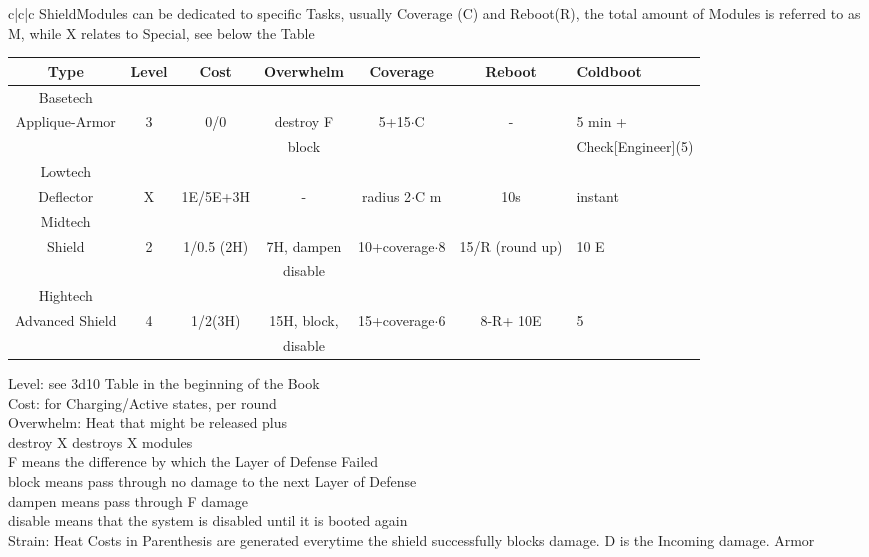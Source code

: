 \documentclass{article}
\newcommand\tab[1][1cm]{\hspace*{#1}}
\begin{document}
\begin{tabular}{c|c|c}
    ShieldModules can be dedicated to specific Tasks, usually
    Coverage (C) and Reboot(R), the total amount of Modules is referred to as M, while
    X relates to Special, see below the Table\newline
    \begin{tabular}{c|cccccl}
        Type & Level & Cost & Overwhelm & Coverage & Reboot & Coldboot \\
        \hline Basetech\\
        Applique-Armor & 3 & 0/0 & destroy F& 5+15\(\cdot\)C & -  & 5 min + \\
        &&&block&&& Check[Engineer](5) \\
        \hline Lowtech\\
        Deflector & X & 1E/5E+3H & - & radius 2\(\cdot\)C m & 10s & instant \\
        \hline Midtech\\
        Shield & 2 & 1/0.5 (2H) & 7H, dampen & 10+coverage\(\cdot\)8 & 15/R (round up) & 10 E \\
        & & & disable\\
        \hline Hightech\\
        Advanced Shield & 4 & 1/2(3H) & 15H, block,& 15+coverage\(\cdot\)6 & 8-R+ 10E & 5 \\
        &&& disable\\
    \end{tabular}\newline\newline\newline
    Level: see 3d10 Table in the beginning of the Book\\
    Cost: for Charging/Active states, per round\\
    Overwhelm: Heat that might be released plus \\
    \tab destroy X destroys X modules\\
    \tab F means the difference by which the Layer of Defense Failed\\
    \tab block means pass through no damage to the next Layer of Defense\\
    \tab dampen means pass through F damage\\
    \tab disable means that the system is disabled until it is booted again\\
    \newline
    Strain: Heat Costs in Parenthesis are generated everytime the shield successfully blocks damage. D is the Incoming damage.
    \pagebreak[2]
    Armor\newline

\end{tabular}
\end{document}
